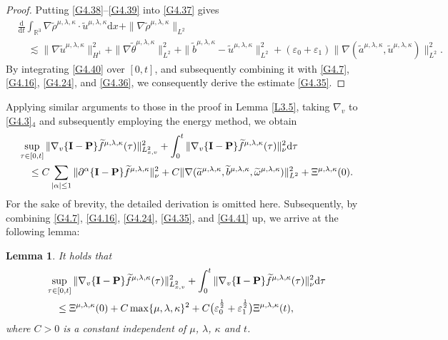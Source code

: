 \documentclass[reqno,11pt]{amsart}
\theoremstyle{plain}
\newtheorem{lem}[thm]{Lemma}
\numberwithin{equation}{section}
\newcommand{\eps}{{\varepsilon}}
\begin{document}
\begin{proof}
Putting \eqref{G4.38}--\eqref{G4.39} into \eqref{G4.37} gives
\begin{align}\label{G4.40}
&\frac{\mathrm{d}}{\mathrm{d} t} \int_{\mathbb{R}^3} \nabla    \widetilde{\rho}^{\mu,\lambda,\kappa} \cdot \widetilde{u}^{\mu,\lambda,\kappa} \mathrm{d} x+\|\nabla\widetilde{\rho}^{\mu,\lambda,\kappa}\|_{L^2}\nonumber\\
&\quad\lesssim \|\nabla\widetilde{u}^{\mu,\lambda,\kappa}\|_{H^1}^2+\|\nabla\widetilde{\theta}^{\mu,\lambda,\kappa}\|_{L^2}^2+\|\widetilde{b}^{\mu,\lambda,\kappa}-\widetilde{u}^{\mu,\lambda,\kappa}\|_{L^2}^2 +(\eps_0+\eps_1)\|\nabla(\widetilde{a}^{\mu,\lambda,\kappa},\widetilde{u}^{\mu,\lambda,\kappa})\|_{L^2}^2.   
\end{align}
By integrating \eqref{G4.40} over $[0,t]$, and subsequently combining it with \eqref{G4.7}, \eqref{G4.16}, \eqref{G4.24}, and \eqref{G4.36}, we consequently derive the estimate \eqref{G4.35}.
\end{proof}

Applying similar arguments to those in the proof in 
Lemma \ref{L3.5}, taking $\nabla_v$ to \eqref{G4.3}$_4$ 
and subsequently employing the energy method, we   obtain  
\begin{align}\label{G4.41}&\sup_{\tau\in[0,t]}
\|\nabla_v\{\mathbf{I}-\mathbf{P}\}\widetilde{f}^{\mu,\lambda,\kappa}(\tau)\|_{L_{x,v}^2}^2
+ \int_0^t\|\nabla_v \{\mathbf{I}-\mathbf{P}\}\widetilde{f}^{\mu,\lambda,\kappa}(\tau)\|_{\nu}^2{\rm d}
\tau \nonumber\\
&\quad \leq C\sum_{|\alpha|\leq 1}\|\partial^\alpha\{\mathbf{I}-\mathbf{P}\}
\widetilde f^{\mu,\lambda,\kappa} \|_{\nu}^2
+C\|\nabla(\widetilde{a}^{\mu,\lambda,\kappa},\widetilde{b}^{\mu,\lambda,\kappa},
\widetilde{\omega}^{\mu,\lambda,\kappa})\|_{L^2}^2+{\Xi} ^{\mu,\lambda,\kappa}(0).\end{align}  
For the sake of brevity, the detailed derivation is omitted here. 
Subsequently, by combining \eqref{G4.7}, \eqref{G4.16}, \eqref{G4.24}, \eqref{G4.35},
 and \eqref{G4.41} up, we arrive at the following lemma:
 
\begin{lem}\label{L4.5}
It holds that
\begin{align}\nonumber%
&\sup_{\tau\in[0,t]}\|\nabla_v\{\mathbf{I}-\mathbf{P}\}
\widetilde{f}^{\mu,\lambda,\kappa}(\tau)\|_{L_{x,v}^2}^2 
+ \int_0^t\|\nabla_v \{\mathbf{I}-\mathbf{P}\}
\widetilde{f}^{\mu,\lambda,\kappa}(\tau)\|_{\nu}^2{\rm d}\tau\nonumber\\
&\quad\leq {\Xi} ^{\mu,\lambda,\kappa}(0)
+C\max\{\mu,\lambda,\kappa\}^2+C \big(\eps_0^\frac{1}{2} 
 +\eps_1^\frac{1}{2}\big){\Xi} ^{\mu,\lambda,\kappa}(t),
\end{align}
where $C>0$ is a constant independent of  $\mu$, $\lambda$,  $\kappa$ and    $t$.
\end{lem}
\end{document}
